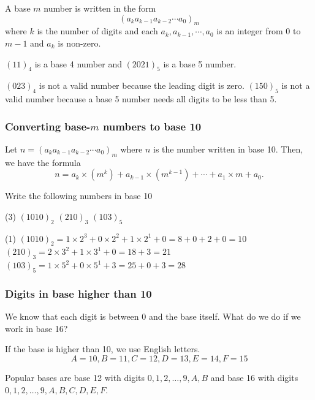 \begin{frame}
\frametitle{}
\begin{defn}{}{}
A base $m$ number is written in the form 
\[(a_k a_{k-1} a_{k-2} \cdots a_0)_m\]
where $k$ is the number of digits and each $a_k, a_{k-1}, \cdots, a_0$ is an integer from 0 to $m-1$ and $a_k$ is non-zero.
\end{defn}
\begin{ex}
$(11)_4$ is a base 4 number and $(2021)_5$ is a base 5 number.
\medskip

$(023)_4$ is not a valid number because the leading digit is zero. $(150)_5$ is not a valid number because a base 5 number needs all digits to be less than 5.
\end{ex}
\end{frame}

\begin{frame}
\frametitle{Converting base-$m$ numbers to base 10}
\begin{defn}{}{}
Let $n = (a_k a_{k-1} a_{k-2} \cdots a_0)_m$ where $n$ is the number written in base 10. Then, we have the formula
\begin{equation}
n = a_k \times (m^k) + a_{k-1} \times (m^{k-1}) + \cdots + a_1 \times m + a_0.
\end{equation}
\end{defn}
\end{frame}


\begin{frame}[t]
\begin{ex}
Write the following numbers in base 10
\begin{tasks}(3)
\task $(1010)_2$
\task $(210)_3$
\task $(103)_5$
\end{tasks}
\end{ex}
\begin{sol}
\begin{tasks}(1)
\task $(1010)_2 = 1 \times 2^3 + 0 \times 2^2 + 1 \times 2^1 + 0 = 8 + 0 + 2 + 0 = 10$
\task $(210)_3 = 2 \times 3^2 + 1 \times 3^1 + 0 = 18 + 3 = 21$
\task $(103)_5 = 1 \times 5^2 + 0 \times 5^1 + 3 = 25 + 0 + 3 = 28$
\end{tasks}
\end{sol}
\end{frame}


\begin{frame}
\frametitle{Digits in base higher than 10}
We know that each digit is between $0$ and the base itself. What do we do if we work in base 16?

\begin{defn}{}{}
If the base is higher than 10, we use English letters. \pause
\[ A = 10, B = 11, C = 12, D = 13, E = 14, F = 15 \]
\end{defn}

Popular bases are base 12 with digits $0,1,2,\ldots, 9,A,B$ and base 16 with digits $0,1,2,\ldots,9,A,B,C,D,E,F$.
\end{frame}


